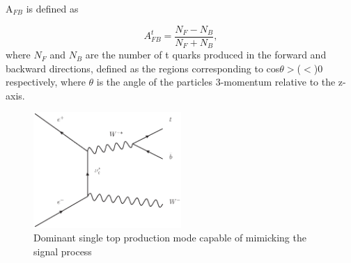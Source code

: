 A$_{FB}$ is defined as

\begin{equation}
A_{FB}^t=\frac{N_F-N_B}{N_F+N_B},
\end{equation}
where $N_{F}$ and $N_{B}$ are the number of t quarks produced in the forward and backward directions,  defined as the regions corresponding to cos$\theta >$($<$)0 respectively, where $\theta$ is the angle of the particles 3-momentum relative to the z-axis.

\begin{figure}[]
  \centering
  \includegraphics[width=0.5\textwidth]{TopAnalysis/figures/SingleTop}
  \caption[Dominant single top production mode]{Dominant single top production mode capable of mimicking the signal process}
  \label{fig:singletop}
\end{figure}



